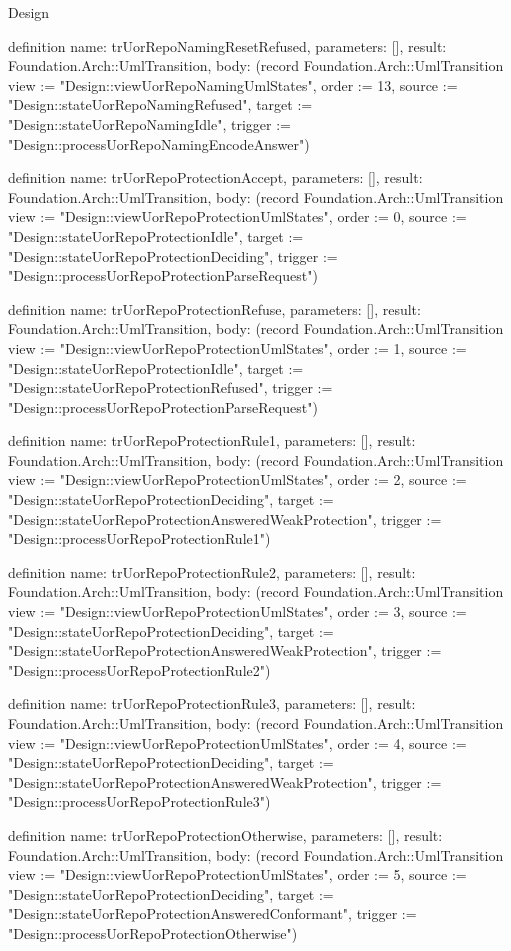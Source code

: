 \begin{lexlean}{Design}
\begin{semanticmodule}
definition{
  name: trUorRepoNamingResetRefused,
  parameters: [],
  result: Foundation.Arch::UmlTransition,
  body: (record Foundation.Arch::UmlTransition {view := "Design::viewUorRepoNamingUmlStates", order := 13, source := "Design::stateUorRepoNamingRefused", target := "Design::stateUorRepoNamingIdle", trigger := "Design::processUorRepoNamingEncodeAnswer"})
}

definition{
  name: trUorRepoProtectionAccept,
  parameters: [],
  result: Foundation.Arch::UmlTransition,
  body: (record Foundation.Arch::UmlTransition {view := "Design::viewUorRepoProtectionUmlStates", order := 0, source := "Design::stateUorRepoProtectionIdle", target := "Design::stateUorRepoProtectionDeciding", trigger := "Design::processUorRepoProtectionParseRequest"})
}

definition{
  name: trUorRepoProtectionRefuse,
  parameters: [],
  result: Foundation.Arch::UmlTransition,
  body: (record Foundation.Arch::UmlTransition {view := "Design::viewUorRepoProtectionUmlStates", order := 1, source := "Design::stateUorRepoProtectionIdle", target := "Design::stateUorRepoProtectionRefused", trigger := "Design::processUorRepoProtectionParseRequest"})
}

definition{
  name: trUorRepoProtectionRule1,
  parameters: [],
  result: Foundation.Arch::UmlTransition,
  body: (record Foundation.Arch::UmlTransition {view := "Design::viewUorRepoProtectionUmlStates", order := 2, source := "Design::stateUorRepoProtectionDeciding", target := "Design::stateUorRepoProtectionAnsweredWeakProtection", trigger := "Design::processUorRepoProtectionRule1"})
}

definition{
  name: trUorRepoProtectionRule2,
  parameters: [],
  result: Foundation.Arch::UmlTransition,
  body: (record Foundation.Arch::UmlTransition {view := "Design::viewUorRepoProtectionUmlStates", order := 3, source := "Design::stateUorRepoProtectionDeciding", target := "Design::stateUorRepoProtectionAnsweredWeakProtection", trigger := "Design::processUorRepoProtectionRule2"})
}

definition{
  name: trUorRepoProtectionRule3,
  parameters: [],
  result: Foundation.Arch::UmlTransition,
  body: (record Foundation.Arch::UmlTransition {view := "Design::viewUorRepoProtectionUmlStates", order := 4, source := "Design::stateUorRepoProtectionDeciding", target := "Design::stateUorRepoProtectionAnsweredWeakProtection", trigger := "Design::processUorRepoProtectionRule3"})
}

definition{
  name: trUorRepoProtectionOtherwise,
  parameters: [],
  result: Foundation.Arch::UmlTransition,
  body: (record Foundation.Arch::UmlTransition {view := "Design::viewUorRepoProtectionUmlStates", order := 5, source := "Design::stateUorRepoProtectionDeciding", target := "Design::stateUorRepoProtectionAnsweredConformant", trigger := "Design::processUorRepoProtectionOtherwise"})
}


\end{semanticmodule}
\end{lexlean}
